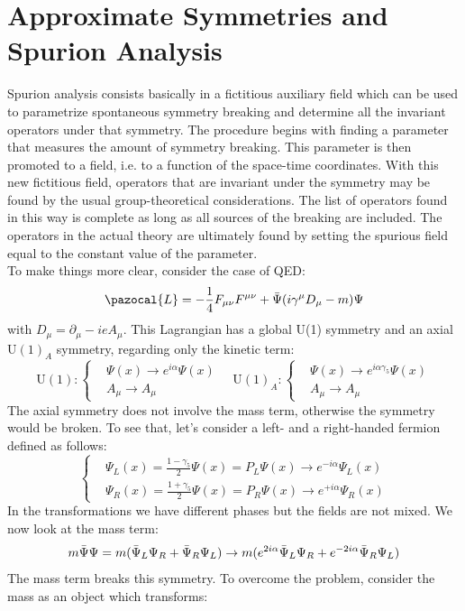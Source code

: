 \documentclass[../main.tex]{subfiles}
\begin{document}
\section{Approximate Symmetries and Spurion Analysis}
Spurion analysis consists basically in a fictitious auxiliary field which can be used to parametrize spontaneous symmetry breaking and determine all the invariant operators under that symmetry. The procedure begins with finding a parameter that measures the amount of symmetry breaking. This parameter is then promoted to a field, i.e. to a function of the space-time coordinates. With this new fictitious field, operators that are invariant under the symmetry may be found by the usual group-theoretical considerations. The list of operators found in this way is complete as long as all sources of the breaking are included. The operators in the actual theory are ultimately found by setting the spurious field equal to the constant value of the parameter.\\
To make things more clear, consider the case of QED:
\[
\pazocal{L}=-\frac{1}{4}F_{\mu\nu}F^{\mu\nu}+\Bar{\Psi}(i\gamma^\mu D_\mu-m)\Psi
\]
with $D_\mu=\partial_\mu-ieA_\mu$. This Lagrangian has a global U(1) symmetry and an axial U$(1)_A$ symmetry, regarding only the kinetic term:
\[
\text{U}(1):
\left\{
\begin{aligned}
&\Psi(x)\to e^{i\alpha}\Psi(x)\\
&A_\mu\to A_\mu
\end{aligned}
\right.
\quad 
\text{U}(1)_A:
\left\{
\begin{aligned}
&\Psi(x)\to e^{i\alpha\gamma_5}\Psi(x)\\
&A_\mu\to A_\mu
\end{aligned}
\right.
\]
The axial symmetry does not involve the mass term, otherwise the symmetry would be broken. To see that, let's consider a left- and a right-handed fermion defined as follows:
\[
\left\{
\begin{aligned}
&\Psi_L(x)=\frac{1-\gamma_5}{2}\Psi(x)=P_L\Psi(x)\to e^{-i\alpha}\Psi_L(x)\\
&\Psi_R(x)=\frac{1+\gamma_5}{2}\Psi(x)=P_R\Psi(x)\to e^{+i\alpha}\Psi_R(x)
\end{aligned}
\right.
\]
In the transformations we have different phases but the fields are not mixed. We now look at the mass term:
\[
m\Bar{\Psi}\Psi=m(\Bar{\Psi}_L\Psi_R+\Bar{\Psi}_R\Psi_L)\to m(e^{2i\alpha}\Bar{\Psi}_L\Psi_R+e^{-2i\alpha}\Bar{\Psi}_R\Psi_L)
\]
The mass term breaks this symmetry. To overcome the problem, consider the mass as an object which transforms:
\end{document}

